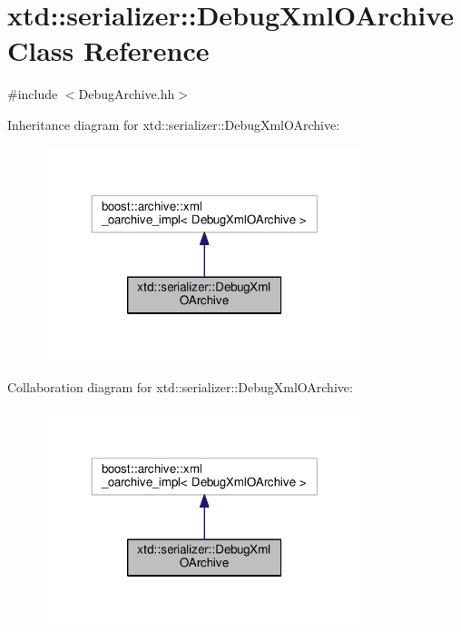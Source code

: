 \hypertarget{classxtd_1_1serializer_1_1DebugXmlOArchive}{}\section{xtd\+:\+:serializer\+:\+:Debug\+Xml\+O\+Archive Class Reference}
\label{classxtd_1_1serializer_1_1DebugXmlOArchive}


{\ttfamily \#include $<$Debug\+Archive.\+hh$>$}



Inheritance diagram for xtd\+:\+:serializer\+:\+:Debug\+Xml\+O\+Archive\+:
\nopagebreak
\begin{figure}[H]
\begin{center}
\leavevmode
\includegraphics[width=266pt]{classxtd_1_1serializer_1_1DebugXmlOArchive__inherit__graph}
\end{center}
\end{figure}


Collaboration diagram for xtd\+:\+:serializer\+:\+:Debug\+Xml\+O\+Archive\+:
\nopagebreak
\begin{figure}[H]
\begin{center}
\leavevmode
\includegraphics[width=266pt]{classxtd_1_1serializer_1_1DebugXmlOArchive__coll__graph}
\end{center}
\end{figure}
